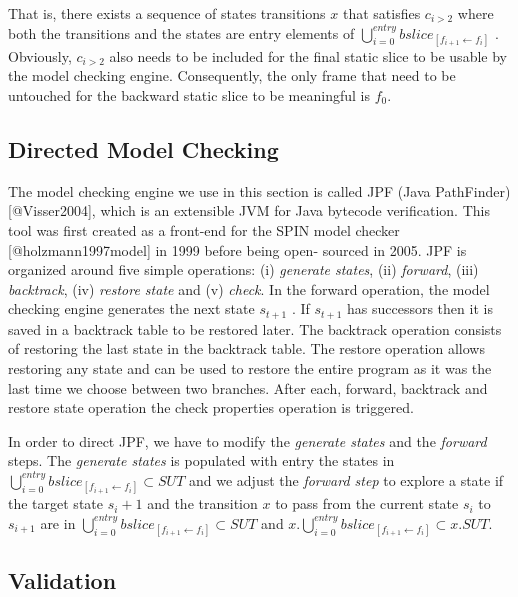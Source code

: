 That is, there exists a sequence of states transitions \(x\) that
satisfies \(c_{i>2}\) where both the transitions and the states are
entry elements of
\(\bigcup_{i=0}^{entry} bslice_{[f_{i+1} \leftarrow f_i]}\) . Obviously,
\(c_{i>2}\) also needs to be included for the final static slice to be
usable by the model checking engine. Consequently, the only frame that
need to be untouched for the backward static slice to be meaningful is
\(f_0\).

\subsection{Directed Model Checking}\label{directed-model-checking}

The model checking engine we use in this section is called JPF (Java
PathFinder) {[}@Visser2004{]}, which is an extensible JVM for Java
bytecode verification. This tool was first created as a front-end for
the SPIN model checker {[}@holzmann1997model{]} in 1999 before being
open- sourced in 2005. JPF is organized around five simple operations:
(i) {\emph{generate states}}, (ii) {\emph{forward}}, (iii)
{\emph{backtrack}}, (iv) {\emph{restore state}} and (v) {\emph{check}}.
In the forward operation, the model checking engine generates the next
state \(s_{t+1}\) . If \(s_{t+1}\) has successors then it is saved in a
backtrack table to be restored later. The backtrack operation consists
of restoring the last state in the backtrack table. The restore
operation allows restoring any state and can be used to restore the
entire program as it was the last time we choose between two branches.
After each, forward, backtrack and restore state operation the check
properties operation is triggered.

In order to direct JPF, we have to modify the {\emph{generate states}}
and the {\emph{forward}} steps. The {\emph{generate states}} is
populated with entry the states in
\(\bigcup_{i=0}^{entry} bslice_{[f_{i+1} \leftarrow f_i]} \subset SUT\)
and we adjust the {\emph{forward step}} to explore a state if the target
state \(s_i+1\) and the transition \(x\) to pass from the current state
\(s_i\) to \(s_{i+1}\) are in
\(\bigcup_{i=0}^{entry} bslice_{[f_{i+1} \leftarrow f_i]} \subset SUT\)
and
\(x.\bigcup_{i=0}^{entry} bslice_{[f_{i+1} \leftarrow f_i]} \subset x.SUT\).

\subsection{Validation}\label{validation}

